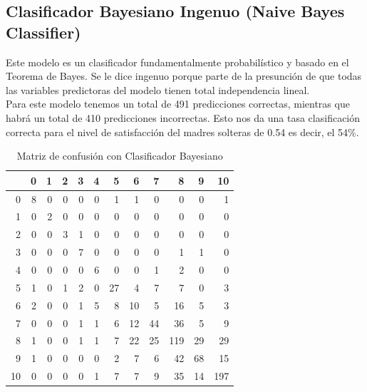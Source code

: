 \documentclass[11pt,twoside]{article}
\begin{document}
\subsection*{Clasificador Bayesiano Ingenuo (Naive Bayes Classifier)}
\noindent
Este modelo es un clasificador fundamentalmente probabilístico y basado en el Teorema de Bayes. Se le dice ingenuo porque parte de la presunción de que todas las variables predictoras del modelo tienen total independencia lineal.
\\
Para este modelo tenemos un total de 491 predicciones correctas, mientras que habrá un total de 410 predicciones incorrectas. Esto nos da una tasa clasificación correcta para el nivel de satisfacción del madres solteras de 0.54 es decir,  el 54\%.

\begin{table}[H]
	\caption{\small{Matriz de confusión con Clasificador Bayesiano}}
	\centering
	\begin{tabular}{r|rrrrrrrrrrr}
		\hline
		& 0 & 1 & 2 & 3 & 4 & 5 & 6 & 7 & 8 & 9 & 10 \\ 
		\hline
		0 &   8 &   0 &   0 &   0 &   0 &   1 &   1 &   0 &   0 &   0 &   1 \\ 
		1 &   0 &   2 &   0 &   0 &   0 &   0 &   0 &   0 &   0 &   0 &   0 \\ 
		2 &   0 &   0 &   3 &   1 &   0 &   0 &   0 &   0 &   0 &   0 &   0 \\ 
		3 &   0 &   0 &   0 &   7 &   0 &   0 &   0 &   0 &   1 &   1 &   0 \\ 
		4 &   0 &   0 &   0 &   0 &   6 &   0 &   0 &   1 &   2 &   0 &   0 \\ 
		5 &   1 &   0 &   1 &   2 &   0 &  27 &   4 &   7 &   7 &   0 &   3 \\ 
		6 &   2 &   0 &   0 &   1 &   5 &   8 &  10 &   5 &  16 &   5 &   3 \\ 
		7 &   0 &   0 &   0 &   1 &   1 &   6 &  12 &  44 &  36 &   5 &   9 \\ 
		8 &   1 &   0 &   0 &   1 &   1 &   7 &  22 &  25 & 119 &  29 &  29 \\ 
		9 &   1 &   0 &   0 &   0 &   0 &   2 &   7 &   6 &  42 &  68 &  15 \\ 
		10 &   0 &   0 &   0 &   0 &   1 &   7 &   7 &   9 &  35 &  14 & 197 \\ 
		\hline
	\end{tabular}
\end{table}
\end{document}
